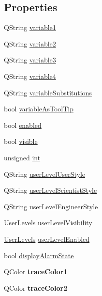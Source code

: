\subsection*{Properties}
\begin{DoxyCompactItemize}
\item 
QString \hyperlink{classQEPlot_ade9ed52d2597230634d7ad4a32cb7150}{variable1}
\item 
QString \hyperlink{classQEPlot_aee6877cd682d63bfbf61575560a70390}{variable2}
\item 
QString \hyperlink{classQEPlot_a9bfab2a67bfeb7701da6df980b200124}{variable3}
\item 
QString \hyperlink{classQEPlot_a34e75617d0de188f7a1dd4c701b4616e}{variable4}
\item 
QString \hyperlink{classQEPlot_a5df88f65fefb802459e9e9df1c3200b8}{variableSubstitutions}
\item 
bool \hyperlink{classQEPlot_a01d27c6da28b8e719ebfc48400fabbfa}{variableAsToolTip}
\item 
bool \hyperlink{classQEPlot_a3bce665d50cf4c8ead83b0f7b914e497}{enabled}
\item 
bool \hyperlink{classQEPlot_aefce7f3abbebfba919e621d1e9227678}{visible}
\item 
unsigned \hyperlink{classQEPlot_a81aaae8a82c382a2ad61aa2990671c1e}{int}
\item 
QString \hyperlink{classQEPlot_a65f72e73ac50f4a85fb5cce783299b49}{userLevelUserStyle}
\item 
QString \hyperlink{classQEPlot_a9c6651e019989197a0e952c8348e4215}{userLevelScientistStyle}
\item 
QString \hyperlink{classQEPlot_ad3827c125cb4f43a333b3cfbaa14bf16}{userLevelEngineerStyle}
\item 
\hyperlink{classQEPlot_a3f70d3a05c74fdd4b58eaeed443bc323}{UserLevels} \hyperlink{classQEPlot_acef17c83a058146755dda5a418624b60}{userLevelVisibility}
\item 
\hyperlink{classQEPlot_a3f70d3a05c74fdd4b58eaeed443bc323}{UserLevels} \hyperlink{classQEPlot_acd90a1dd927f697ad58a888a748cff07}{userLevelEnabled}
\item 
bool \hyperlink{classQEPlot_a36de8c7bec3e3ef4486f4b98694fbdd8}{displayAlarmState}
\item 
\hypertarget{classQEPlot_a1b4b928764ae61f64d3816518c3fa0b5}{
QColor {\bfseries traceColor1}}
\label{classQEPlot_a1b4b928764ae61f64d3816518c3fa0b5}

\item 
\hypertarget{classQEPlot_aaf7fb0ace584472bf2ced4fb2baf3783}{
QColor {\bfseries traceColor2}}
\label{classQEPlot_aaf7fb0ace584472bf2ced4fb2baf3783}


\end{DoxyCompactItemize}
